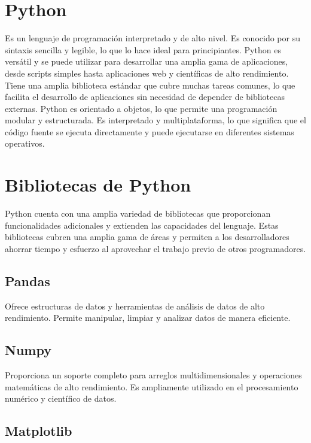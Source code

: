 \section{Python}

Es un lenguaje de programación interpretado y de alto nivel. Es conocido por su sintaxis sencilla y legible, lo que lo hace ideal para principiantes. Python\cite{python:1991} es versátil y se puede utilizar para desarrollar una amplia gama de aplicaciones, desde scripts simples hasta aplicaciones web y científicas de alto rendimiento. Tiene una amplia biblioteca estándar que cubre muchas tareas comunes, lo que facilita el desarrollo de aplicaciones sin necesidad de depender de bibliotecas externas. Python es orientado a objetos, lo que permite una programación modular y estructurada. Es interpretado y multiplataforma, lo que significa que el código fuente se ejecuta directamente y puede ejecutarse en diferentes sistemas operativos.

\section{Bibliotecas de Python}

Python cuenta con una amplia variedad de bibliotecas que proporcionan funcionalidades adicionales y extienden las capacidades del lenguaje. Estas bibliotecas cubren una amplia gama de áreas y permiten a los desarrolladores ahorrar tiempo y esfuerzo al aprovechar el trabajo previo de otros programadores.

\subsection{Pandas}

Ofrece estructuras de datos y herramientas de análisis de datos de alto rendimiento. Permite manipular, limpiar y analizar datos de manera eficiente.

\subsection{Numpy}

Proporciona un soporte completo para arreglos multidimensionales y operaciones matemáticas de alto rendimiento. Es ampliamente utilizado en el procesamiento numérico y científico de datos.

\subsection{Matplotlib}

